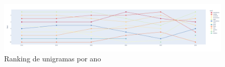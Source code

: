 \begin{figure}
	\centering
	\includegraphics[width=1\textwidth]{figs/exploratoria/ranking_unigramas_por_ano.png}
	\caption{Ranking de unigramas por ano}
	\label{img:rank_unigramas}
\end{figure}


